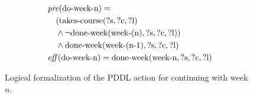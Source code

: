 \begin{figure}[t]
  \begin{align*}
  &\mathit{pre}(\text{do-week-n}) = \\
  &\quad ( \text{takes-course}(\text{?s}, \text{?c}, \text{?l}) \\
  &\quad \land \lnot \text{done-week}(\text{week-(n)}, \text{?s}, \text{?c}, \text{?l})) \\
  &\quad \land \text{done-week}(\text{week-(n-1)}, \text{?s}, \text{?c}, \text{?l}) \\
  &\mathit{eff}(\text{do-week-n}) = \text{done-week}(\text{week-n}, \text{?s}, \text{?c}, \text{?l})
  \end{align*}
  \caption{Logical formalization of the PDDL action for continuing with week $n$.}\label{fig:do-week-n}
\end{figure}
